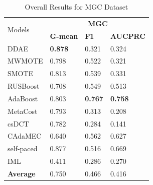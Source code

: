 \begin{table}[H]
    \centering
    \renewcommand\arraystretch{0.85}
    \begin{tabular}{|p{}<{\centering}|p{}<{\centering}|p{}<{\centering}|p{}<{\centering}|}
    \hline
    \multirow{2}{*}{Models} & \multicolumn{3}{c|}{\textbf{MGC}}    \\ \cline{2-4} 
                             & \textbf{G-mean} & \textbf{F1} & \textbf{AUCPRC} \\ \hline
    DDAE                     & \textbf{0.878}	&0.321	&0.324               \\ \hline
    MWMOTE                   &0.798	&0.522	&0.321              \\ \hline
    SMOTE                    & 0.813	&0.539	&0.331               \\ \hline
    RUSBoost                 &0.708	&0.549	&0.513              \\ \hline
    AdaBoost                 & 0.803	&\textbf{0.767}	&\textbf{0.758}               \\ \hline
    MetaCost                 & 0.793	&0.313	&0.208               \\ \hline
    csDCT                    & 0.782	&0.284	&0.141               \\ \hline
    CAdaMEC                  & 0.640	&0.562	&0.627               \\ \hline
    self-paced               & 0.877	&0.516	&0.669                \\ \hline
    IML                      & 0.411	&0.286	&0.270             \\ \hline\hline
    \textbf{Average}         & 0.750	&0.466	&0.416                \\ \hline
    \end{tabular}
    \vspace{-8pt}
    \caption{Overall Results for MGC Dataset}
    \label{tab13}
\end{table}
\vspace{-13pt}
